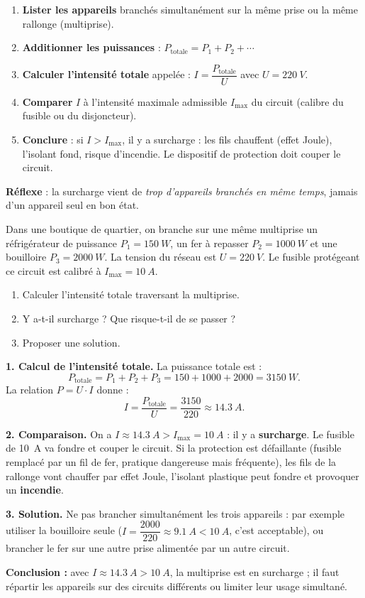 \documentclass[11pt]{article}
\newcommand{\cle}[1]{{\popxbold\color{popdark}#1}}
\begin{document}
\begin{methode}
\begin{enumerate}
\item \textbf{Lister les appareils} branchés simultanément sur la même prise ou la même rallonge (multiprise).
\item \textbf{Additionner les puissances} : $P_{\text{totale}} = P_1 + P_2 + \cdots$
\item \textbf{Calculer l'intensité totale} appelée : $I = \dfrac{P_{\text{totale}}}{U}$ avec $U = \SI{220}{V}$.
\item \textbf{Comparer} $I$ à l'intensité maximale admissible $I_{\max}$ du circuit (calibre du fusible ou du disjoncteur).
\item \textbf{Conclure} : si $I > I_{\max}$, il y a \cle{surcharge} : les fils chauffent (effet Joule), l'isolant fond, risque d'incendie. Le dispositif de protection doit couper le circuit.
\end{enumerate}
\textbf{Réflexe} : la surcharge vient de \emph{trop d'appareils branchés en même temps}, jamais d'un appareil seul en bon état.
\end{methode}

\begin{exoresolu}
Dans une boutique de quartier, on branche sur une même multiprise un réfrigérateur de puissance $P_1 = \SI{150}{W}$, un fer à repasser $P_2 = \SI{1000}{W}$ et une bouilloire $P_3 = \SI{2000}{W}$. La tension du réseau est $U = \SI{220}{V}$. Le fusible protégeant ce circuit est calibré à $I_{\max} = \SI{10}{A}$.
\begin{enumerate}
\item Calculer l'intensité totale traversant la multiprise.
\item Y a-t-il surcharge ? Que risque-t-il de se passer ?
\item Proposer une solution.
\end{enumerate}
\tcblower
\textbf{1. Calcul de l'intensité totale.} La puissance totale est :
\[ P_{\text{totale}} = P_1 + P_2 + P_3 = 150 + 1000 + 2000 = \SI{3150}{W}. \]
La relation $P = U \cdot I$ donne :
\[ I = \frac{P_{\text{totale}}}{U} = \frac{3150}{220} \approx \SI{14,3}{A}. \]

\textbf{2. Comparaison.} On a $I \approx \SI{14,3}{A} > I_{\max} = \SI{10}{A}$ : il y a \textbf{surcharge}. Le fusible de \SI{10}{A} va fondre et couper le circuit. Si la protection est défaillante (fusible remplacé par un fil de fer, pratique dangereuse mais fréquente), les fils de la rallonge vont chauffer par effet Joule, l'isolant plastique peut fondre et provoquer un \textbf{incendie}.

\textbf{3. Solution.} Ne pas brancher simultanément les trois appareils : par exemple utiliser la bouilloire seule ($I = \dfrac{2000}{220} \approx \SI{9,1}{A} < \SI{10}{A}$, c'est acceptable), ou brancher le fer sur une autre prise alimentée par un autre circuit.

\textbf{Conclusion :} avec $I \approx \SI{14,3}{A} > \SI{10}{A}$, la multiprise est en surcharge ; il faut répartir les appareils sur des circuits différents ou limiter leur usage simultané.
\end{exoresolu}
\end{document}
